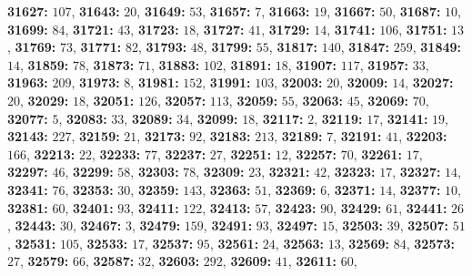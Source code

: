 \textsf{\bfseries 31627:} $107$, \textsf{\bfseries 31643:} $20$, \textsf{\bfseries 31649:} $53$, \textsf{\bfseries 31657:} $7$, \textsf{\bfseries 31663:} $19$, \textsf{\bfseries 31667:} $50$, \textsf{\bfseries 31687:} $10$, \textsf{\bfseries 31699:} $84$, \textsf{\bfseries 31721:} $43$, \textsf{\bfseries 31723:} $18$, \textsf{\bfseries 31727:} $41$, \textsf{\bfseries 31729:} $14$, \textsf{\bfseries 31741:} $106$, \textsf{\bfseries 31751:} $13$, \textsf{\bfseries 31769:} $73$, \textsf{\bfseries 31771:} $82$, \textsf{\bfseries 31793:} $48$, \textsf{\bfseries 31799:} $55$, \textsf{\bfseries 31817:} $140$, \textsf{\bfseries 31847:} $259$, \textsf{\bfseries 31849:} $14$, \textsf{\bfseries 31859:} $78$, \textsf{\bfseries 31873:} $71$, \textsf{\bfseries 31883:} $102$, \textsf{\bfseries 31891:} $18$, \textsf{\bfseries 31907:} $117$, \textsf{\bfseries 31957:} $33$, \textsf{\bfseries 31963:} $209$, \textsf{\bfseries 31973:} $8$, \textsf{\bfseries 31981:} $152$, \textsf{\bfseries 31991:} $103$, \textsf{\bfseries 32003:} $20$, \textsf{\bfseries 32009:} $14$, \textsf{\bfseries 32027:} $20$, \textsf{\bfseries 32029:} $18$, \textsf{\bfseries 32051:} $126$, \textsf{\bfseries 32057:} $113$, \textsf{\bfseries 32059:} $55$, \textsf{\bfseries 32063:} $45$, \textsf{\bfseries 32069:} $70$, \textsf{\bfseries 32077:} $5$, \textsf{\bfseries 32083:} $33$, \textsf{\bfseries 32089:} $34$, \textsf{\bfseries 32099:} $18$, \textsf{\bfseries 32117:} $2$, \textsf{\bfseries 32119:} $17$, \textsf{\bfseries 32141:} $19$, \textsf{\bfseries 32143:} $227$, \textsf{\bfseries 32159:} $21$, \textsf{\bfseries 32173:} $92$, \textsf{\bfseries 32183:} $213$, \textsf{\bfseries 32189:} $7$, \textsf{\bfseries 32191:} $41$, \textsf{\bfseries 32203:} $166$, \textsf{\bfseries 32213:} $22$, \textsf{\bfseries 32233:} $77$, \textsf{\bfseries 32237:} $27$, \textsf{\bfseries 32251:} $12$, \textsf{\bfseries 32257:} $70$, \textsf{\bfseries 32261:} $17$, \textsf{\bfseries 32297:} $46$, \textsf{\bfseries 32299:} $58$, \textsf{\bfseries 32303:} $78$, \textsf{\bfseries 32309:} $23$, \textsf{\bfseries 32321:} $42$, \textsf{\bfseries 32323:} $17$, \textsf{\bfseries 32327:} $14$, \textsf{\bfseries 32341:} $76$, \textsf{\bfseries 32353:} $30$, \textsf{\bfseries 32359:} $143$, \textsf{\bfseries 32363:} $51$, \textsf{\bfseries 32369:} $6$, \textsf{\bfseries 32371:} $14$, \textsf{\bfseries 32377:} $10$, \textsf{\bfseries 32381:} $60$, \textsf{\bfseries 32401:} $93$, \textsf{\bfseries 32411:} $122$, \textsf{\bfseries 32413:} $57$, \textsf{\bfseries 32423:} $90$, \textsf{\bfseries 32429:} $61$, \textsf{\bfseries 32441:} $26$, \textsf{\bfseries 32443:} $30$, \textsf{\bfseries 32467:} $3$, \textsf{\bfseries 32479:} $159$, \textsf{\bfseries 32491:} $93$, \textsf{\bfseries 32497:} $15$, \textsf{\bfseries 32503:} $39$, \textsf{\bfseries 32507:} $51$, \textsf{\bfseries 32531:} $105$, \textsf{\bfseries 32533:} $17$, \textsf{\bfseries 32537:} $95$, \textsf{\bfseries 32561:} $24$, \textsf{\bfseries 32563:} $13$, \textsf{\bfseries 32569:} $84$, \textsf{\bfseries 32573:} $27$, \textsf{\bfseries 32579:} $66$, \textsf{\bfseries 32587:} $32$, \textsf{\bfseries 32603:} $292$, \textsf{\bfseries 32609:} $41$, \textsf{\bfseries 32611:} $60$, 
